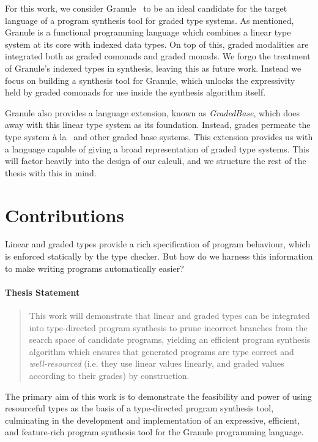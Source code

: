 For this work, we consider Granule~\citep{DBLP:journals/pacmpl/OrchardLE19} to
be an ideal candidate for the target language of a program synthesis tool for
graded type systems. As mentioned, Granule is a functional programming language
which combines a linear type system at its core with indexed data types. On top
of this, graded modalities are integrated both as graded comonads and graded
monads. We forgo the treatment of Granule's indexed types in synthesis, leaving
this as future work. Instead we focus on building a synthesis tool for Granule,
which unlocks the expressivity held by graded comonads for use inside the
synthesis algorithm itself.

Granule also provides a language extension, known as \emph{GradedBase}, which
does away with this linear type system as its foundation. Instead, grades
permeate the type system à la~\citet{petricek2014coeffects} and other graded
base systems. This extension provides us with a language capable of giving a
broad representation of graded type systems. This will factor heavily into the
design of our calculi, and we structure the rest of the thesis with this in
mind.

\section{Contributions}
Linear and graded types provide a rich specification of program behaviour, which
is enforced statically by the type checker. But how do we harness this
information to make    
writing programs automatically easier?  

\paragraph{Thesis Statement} 
\label{para:thesis-statement}
\begin{quote}
      This work will demonstrate that linear and graded
types can be integrated into type-directed program synthesis to prune incorrect
branches from the search space of candidate programs, yielding an efficient
program synthesis algorithm which ensures that generated programs are type
correct and \emph{well-resourced} (i.e. they use linear values linearly, and
graded values according to their grades) by construction. 
\end{quote}
 
The primary aim of this work is to demonstrate the feasibility and power of
using resourceful types as the basis of a type-directed program synthesis tool,
culminating in the development and implementation of an expressive, efficient,
and feature-rich program synthesis tool for the Granule programming language. 

